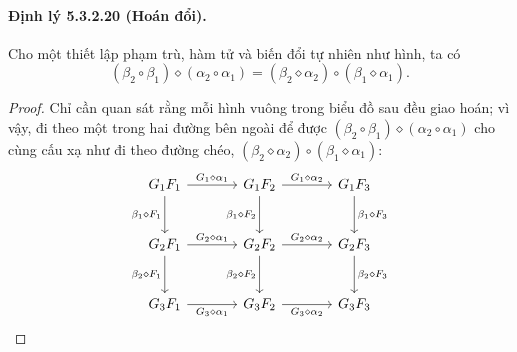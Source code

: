 \paragraph{Định lý 5.3.2.20 (Hoán đổi).}
\begin{center}\end{center}
Cho một thiết lập phạm trù, hàm tử và biến đổi tự nhiên như hình, ta có
\[(\beta_2\circ\beta_1)\diamond(\alpha_2\circ\alpha_1)=(\beta_2\diamond\alpha_2)\circ(\beta_1\diamond\alpha_1).\]
\begin{proof}Chỉ cần quan sát rằng mỗi hình vuông trong biểu đồ sau đều giao hoán; vì vậy, đi theo một trong hai đường bên ngoài để được $(\beta_2\circ\beta_1)\diamond(\alpha_2\circ\alpha_1)$ cho cùng cấu xạ như đi theo đường chéo, $(\beta_2\diamond\alpha_2)\circ(\beta_1\diamond\alpha_1)$:
\[\begin{tikzcd}[column sep=large,row sep=large]
G_1F_1\arrow[r,"G_1\diamond\alpha_1"]\arrow[d,"\beta_1\diamond F_1"']&G_1F_2\arrow[r,"G_1\diamond\alpha_2"]\arrow[d,"\beta_1\diamond F_2"']&G_1F_3\arrow[d,"\beta_1\diamond F_3"]\\
G_2F_1\arrow[r,"G_2\diamond\alpha_1"]\arrow[d,"\beta_2\diamond F_1"']&G_2F_2\arrow[r,"G_2\diamond\alpha_2"]\arrow[d,"\beta_2\diamond F_2"']&G_2F_3\arrow[d,"\beta_2\diamond F_3"]\\
G_3F_1\arrow[r,"G_3\diamond\alpha_1"']&G_3F_2\arrow[r,"G_3\diamond\alpha_2"']&G_3F_3
\end{tikzcd}\]
\end{proof}

